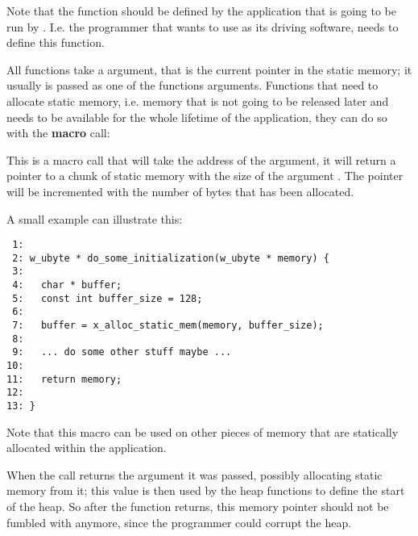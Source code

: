 


Note that the  function should be defined by the
application that is going to be run by \oswald. I.e. the programmer that
wants to use \oswald as its driving software, needs to define this function.

All functions take a  argument, that is the current
pointer in the static memory; it usually is passed as one of the functions
arguments. Functions that need to allocate static memory,
i.e. memory that is not going to be released later and needs to be available
for the whole lifetime of the application, they can do so with the
\textbf{macro} call:


This is a macro call that will take the address of the 
argument, it will return a pointer to a chunk of static memory with the size
of the argument . The  pointer will
be incremented with the number of bytes that has been allocated.

A small example can illustrate this:

\bcode
\begin{verbatim}
 1: 
 2: w_ubyte * do_some_initialization(w_ubyte * memory) {
 3:
 4:   char * buffer;
 5:   const int buffer_size = 128;
 6: 
 7:   buffer = x_alloc_static_mem(memory, buffer_size);
 8:   
 9:   ... do some other stuff maybe ...
10:  
11:   return memory;
12: 
13: }
\end{verbatim}
\ecode

Note that this macro can be used on other pieces of memory that are
statically allocated within the application.

When the call  returns the  argument it was
passed, possibly allocating static memory from it; this value is then used by the
heap functions to define the start of the heap. So after the
 function returns, this memory pointer should not be
fumbled with anymore, since the programmer could corrupt the heap.